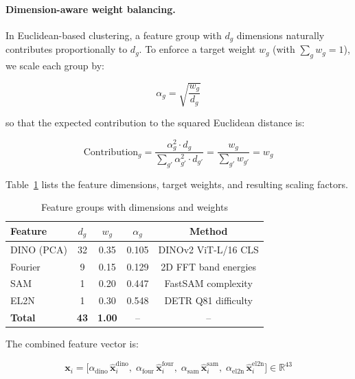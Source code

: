 \paragraph{Dimension-aware weight balancing.}
In Euclidean-based clustering, a feature group with $d_g$ dimensions
naturally contributes proportionally to $d_g$.  To enforce a target weight
$w_g$ (with $\sum_g w_g = 1$), we scale each group by:

\begin{equation}
    \alpha_g = \sqrt{\frac{w_g}{d_g}}
    \label{eq:alpha}
\end{equation}

so that the expected contribution to the squared Euclidean distance is:

\begin{equation}
    \text{Contribution}_g
    = \frac{\alpha_g^2 \cdot d_g}{\sum_{g'} \alpha_{g'}^2 \cdot d_{g'}}
    = \frac{w_g}{\sum_{g'} w_{g'}}
    = w_g
\end{equation}

Table~\ref{tab:features} lists the feature dimensions, target weights, and
resulting scaling factors.

\begin{table}[h]
\centering
\caption{Feature groups with dimensions and weights}
\label{tab:features}
\begin{tabular}{lcccc}
\toprule
\textbf{Feature} & $d_g$ & $w_g$ & $\alpha_g$ & \textbf{Method} \\
\midrule
DINO (PCA)  & 32 & 0.35 & 0.105 & DINOv2 ViT-L/16 CLS \\
Fourier     &  9 & 0.15 & 0.129 & 2D FFT band energies \\
SAM         &  1 & 0.20 & 0.447 & FastSAM complexity \\
EL2N        &  1 & 0.30 & 0.548 & DETR Q81 difficulty \\
\midrule
\textbf{Total} & \textbf{43} & \textbf{1.00} & -- & -- \\
\bottomrule
\end{tabular}
\end{table}

The combined feature vector is:

\begin{equation}
    \mathbf{x}_i =
    \bigl[
        \alpha_{\text{dino}}\,\hat{\mathbf{x}}_{i}^{\text{dino}},\;
        \alpha_{\text{four}}\,\hat{\mathbf{x}}_{i}^{\text{four}},\;
        \alpha_{\text{sam}}\,\hat{\mathbf{x}}_{i}^{\text{sam}},\;
        \alpha_{\text{el2n}}\,\hat{\mathbf{x}}_{i}^{\text{el2n}}
    \bigr]
    \in \mathbb{R}^{43}
\end{equation}

